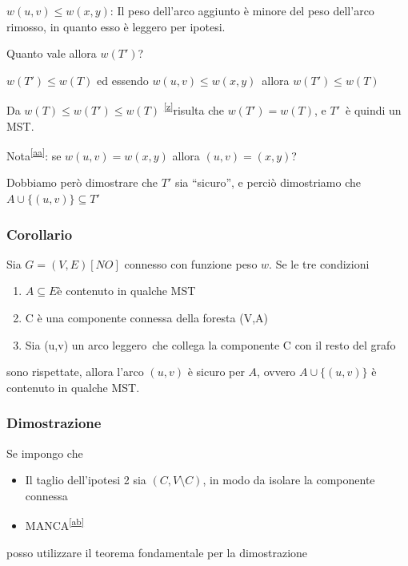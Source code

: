 \documentclass{article}
\providecommand{\tightlist}{%
  \setlength{\itemsep}{0pt}\setlength{\parskip}{0pt}}
\begin{document}
$w(u,v) \leq w(x,y)${: Il peso dell'arco aggiunto è minore del peso dell'arco rimosso, in quanto esso è leggero per ipotesi.}

{Quanto vale allora $w(T')$? }

$w(T') \leq w(T)$ {ed essendo }$w(u,v) \leq w(x,y)${~allora $w(T') \leq w(T)$}

{Da }$w(T) \leq w(T') \leq w(T)$ \textsuperscript{\protect\hyperlink{cmnt26}{{[}z{]}}}{risulta che $w(T') = w(T)$, e }$T'${~è quindi un MST.}

{Nota}\textsuperscript{\protect\hyperlink{cmnt27}{{[}aa{]}}}{: se $w(u,v) = w(x,y)$ allora $(u,v) = (x,y)$?}

{Dobbiamo però dimostrare che $T'$ sia ``sicuro'', e perciò dimostriamo che \\ $A \cup \{(u,v)\} \subseteq T'$}

\subsubsection{Corollario}

{Sia $G=(V,E) [NO]$ connesso con funzione peso $w$. Se le tre condizioni}

\begin{enumerate}
\tightlist
\item
  $A \subseteq E${è contenuto in qualche MST}
\item
  {C è una componente connessa della foresta (V,A)}
\item
  {Sia (u,v) un arco }{leggero}{~che collega la componente C con il
  resto del grafo}
\end{enumerate}

{sono rispettate, allora l'arco $(u,v)$ è sicuro per $A$, ovvero $A \cup \{(u,v)\}$ è contenuto in qualche MST.}


\subsubsection{Dimostrazione}

{Se impongo che}

\begin{itemize}
\tightlist
\item
  {Il taglio dell'ipotesi 2 sia $(C,V\setminus C)$, in modo da isolare la componente connessa}
\item
  {MANCA}\textsuperscript{\protect\hyperlink{cmnt28}{{[}ab{]}}}
\end{itemize}

{posso utilizzare il teorema fondamentale per la dimostrazione}
\end{document}
